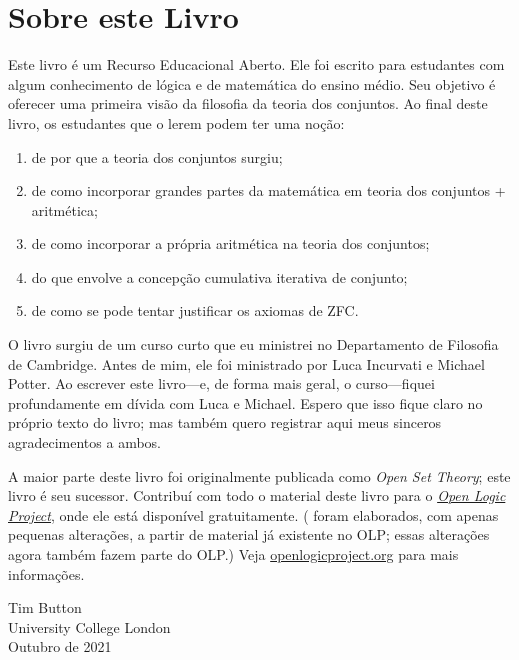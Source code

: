 \chapter{Sobre este Livro}

Este livro é um Recurso Educacional Aberto. Ele foi escrito para estudantes
com algum conhecimento de lógica e de matemática do ensino médio.
Seu objetivo é oferecer uma primeira visão da filosofia da teoria dos
conjuntos. Ao final deste livro, os estudantes que o lerem podem ter uma
noção:
\begin{enumerate}
	\item de por que a teoria dos conjuntos surgiu;
	\item de como incorporar grandes partes da matemática em teoria dos conjuntos + aritmética;
	\item de como incorporar a própria aritmética na teoria dos conjuntos;
	\item do que envolve a concepção cumulativa iterativa de conjunto;
	\item de como se pode tentar justificar os axiomas de ZFC.
\end{enumerate}
O livro surgiu de um curso curto que eu ministrei no Departamento de Filosofia de Cambridge. Antes de mim, ele foi ministrado por Luca Incurvati e Michael
Potter. Ao escrever este livro---e, de forma mais geral, o curso---fiquei
profundamente em dívida com Luca e Michael. Espero que isso fique claro no próprio texto do livro; mas também quero registrar aqui
meus sinceros agradecimentos a ambos.

A maior parte deste livro foi originalmente publicada como \emph{Open
Set Theory}; este livro é seu sucessor. Contribuí com todo o material deste livro para o \href{http://openlogicproject.org}{\emph{Open Logic Project}}, onde ele está disponível gratuitamente. ( foram elaborados, com apenas
pequenas alterações, a partir de material já existente no OLP; essas alterações agora também fazem parte do OLP.) Veja
\href{http://openlogicproject.org/}{openlogicproject.org} para mais
informações.

\begin{flushright}
Tim Button
\\University College London
\\Outubro de 2021
\end{flushright}
